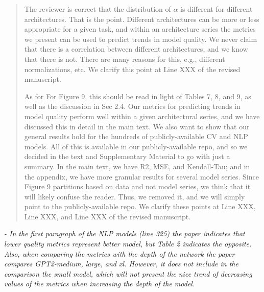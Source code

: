 \documentclass[11pt]{article}
\begin{document}
\begin{quote}
The reviewer is correct that the distribution of $\alpha$ is different for different architectures.
That is the point.
Different architectures can be more or less appropriate for a given task, and within an architecture series the metrics we present can be used to predict trends in model quality.
We never claim that there is a correlation between different architectures, and we know that there is not.
There are many reasons for this, e.g., different normalizations, etc.
We clarify this point at Line XXX of the revised manuscript.

As for For Figure 9, this should be read in light of Tables 7, 8, and 9, as well as the discussion in Sec 2.4.  
Our metrics for predicting trends in model quality perform well within a given architectural series, and we have discussed this in detail in the main text.
We also want to show that our general results hold for the hundreds of publicly-available CV and NLP models.
All of this is available in our publicly-available repo, and so we decided in the text and Supplementary Material to go with just a summary.
In the main text, we have R2, MSE, and Kendall-Tau; and in the appendix, we have more granular results for several model series.
Since Figure 9 partitions based on data and not model series, we think that it will likely confuse the reader.
Thus, we removed it, and we will simply point to the publicly-available repo.
%
We clarify these points at Line XXX, Line XXX, and Line XXX of the revised manuscript.
\end{quote}

\noindent
\emph{%
- In the first paragraph of the NLP models (line 325) the paper indicates that lower quality metrics represent better model, but Table 2 indicates the opposite. Also, when comparing the metrics with the depth of the network the paper compares GPT2-medium, large, and xl. However, it does not include in the comparison the small model, which will not present the nice trend of decreasing values of the metrics when increasing the depth of the model.
}
\end{document}

